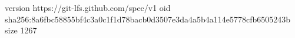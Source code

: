 version https://git-lfs.github.com/spec/v1
oid sha256:8a6fbc58855bf4c3a0c1f1d78bacb0d3507e3da4a5b4a114e5778cfb6505243b
size 1267
